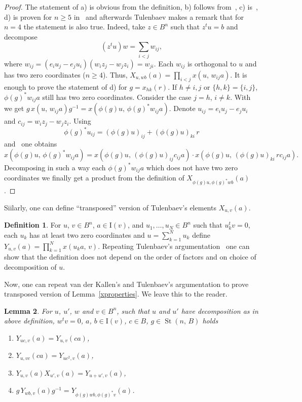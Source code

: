 \documentclass[11pt]{amsart}
\theoremstyle{plain} \declaretheorem[name=Theorem, Refname={Theorem,Theorems}]{tm} \Crefname{tm}{Theorem}{Theorems}
\numberwithin{equation}{section}
\newtheorem{lm}{Lemma} \numberwithin{lm}{section} \Crefname{lm}{Lemma}{Lemmas}
\theoremstyle{definition} \newtheorem{df}[lm]{Definition} \Crefname{df}{Definition}{Definitions}
\theoremstyle{remark} \newtheorem{rk}[lm]{Remark} \Crefname{rk}{Remark}{Remarks}
\newcommand{\St}{\mathop{\mathrm{St}}\nolimits}
\newcommand{\inv}{^{-1}}
\begin{document}
\begin{proof}
The statement of a) is obvious from the definition, b) follows from~\cite[Lem.~1.1\,d)]{Tul}, c) is~\cite[Lem.~1.3\,a)]{Tul}, d) is proven for $n\geq5$ in~\cite[Lem.~1.3\,b)]{Tul} and afterwards Tulenbaev makes a remark that for $n=4$ the statement is also true. Indeed, take $z\in B^n$ such that $z^tu=b$ and decompose
$$
(z^tu)w=\sum_{i<j}w_{ij},
$$
where $w_{ij}=(e_iu_j-e_ju_i)(w_iz_j-w_jz_i)=w_{ji}$. Each $w_{ij}$ is orthogonal to $u$ and has two zero coordinates ($n\geq4$). Thus, $X_{u,wb}(a)=\prod_{i<j}x(u,\,w_{ij}a)$. It is enough to prove the statement of d) for $g=x_{hk}(r)$. If $h\neq i,j$ or $\{h,k\}=\{i,j\}$, $\phi(g)^*w_{ij}a$ still has two zero coordinates. Consider the case $j=h$, $i\neq k$. With~\cite[3.12]{vdK} we get $g\,x(u,\,w_{ij}a)g\inv=x(\phi(g)u,\,\phi(g)^*w_{ij}a)$. Denote $u_{ij}=e_iu_j-e_ju_i$ and $c_{ij}=w_iz_j-w_jz_i$. Using
$$
\phi(g)^*u_{ij}=(\phi(g)u)_{ij}+(\phi(g)u)_{ki}\,r
$$
and~\cite[3.11]{vdK} one obtains
$$
x(\phi(g)u,\,\phi(g)^*w_{ij}a)=x(\phi(g)u,\,(\phi(g)u)_{ij}c_{ij}a)\cdot x(\phi(g)u,\,(\phi(g)u)_{ki}\,rc_{ij}a).
$$
Decomposing in such a way each $\phi(g)^*w_{ij}a$ which does not have two zero coordinates we finally get a product from the definition of $X_{\phi(g)u,\phi(g)^*wb}(a)$.
\end{proof}

Siilarly, one can define ``transposed'' version of Tulenbaev's elements $X_{u,v}(a)$.

\begin{df}
For $u$, $v\in B^n$, $a\in\mathrm I(v)$, and $u_1,\ldots,u_N\in B^n$ such that $u_k^tv=0$, each $u_k$ has at least two zero coordinates and $u=\sum_{k=1}^Nu_k$ define $Y_{u,v}(a)=\prod\limits_{k=1}^Nx(u_ka,\,v)$. Repeating Tulenbaev's argumentation~\cite[p.~3]{Tul} one can show that the definition does not depend on the order of factors and on choice of decomposition of $u$.
\end{df}

Now, one can repeat van der Kallen's and Tulenbaev's argumentation to prove transposed version of Lemma~\ref{xproperties}. We leave this to the reader.

\begin{lm}
\label{yproperties}
For $u$, $u'$, $w$ and $v\in B^n$, such that $u$ and $u'$ have decomposition as in above definition, $w^tv=0$, $a$, $b\in\mathrm I(v)$, $c\in B$, $g\in\St(n,\,B)$ holds
\begin{enumerate}
\item
$Y_{uc,v}(a)=Y_{u,v}(ca)$,
\item
$Y_{u,vc}(ca)=Y_{uc^2,v}(a)$,
\item
$Y_{u,v}(a)X_{u',v}(a)=Y_{u+u',v}(a)$,
\item
$g\,Y_{wb,v}(a)g\inv=Y_{\phi(g)wb,\phi(g)^*v}(a)$.
\end{enumerate}
\end{lm}
\end{document}
